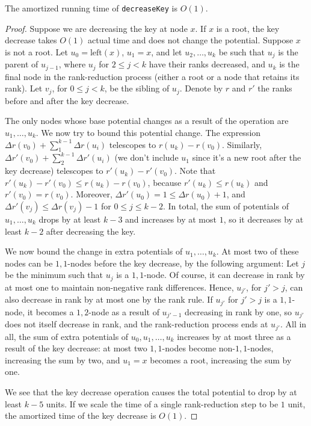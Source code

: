 \begin{lemma}
The amortized running time of \texttt{decreaseKey} is \(O(1)\).
\end{lemma}
\begin{proof}
Suppose we are decreasing the key at node \(x\). If \(x\) is a root, the key decrease takes \(O(1)\) actual time and does not change the potential. Suppose \(x\) is not a root. Let \(u_0 = \text{left}(x)\), \(u_1 = x\), and let \(u_2, \ldots, u_k\) be such that \(u_j\) is the parent of \(u_{j-1}\), where \(u_j\) for \(2 \leq j < k\) have their ranks decreased, and \(u_k\) is the final node in the rank-reduction process (either a root or a node that retains its rank). Let \(v_j\), for \(0 \leq j < k\), be the sibling of \(u_{j}\). Denote by \(r\) and \(r'\) the ranks before and after the key decrease.

The only nodes whose base potential changes as a result of the operation are \(u_1, \ldots, u_k\). We now try to bound this potential change. The expression \(\Delta r(v_0) + \sum_{1}^{k-1}\Delta r(u_i)\) telescopes to \(r(u_k) - r(v_0)\). Similarly, \(\Delta r'(v_0) + \sum_{2}^{k-1}\Delta r'(u_i)\) (we don't include \(u_1\) since it's a new root after the key decrease) telescopes to \(r'(u_k) - r'(v_0)\). Note that \(r'(u_k) - r'(v_0) \leq r(u_k) - r(v_0)\), because \(r'(u_k) \leq r(u_k)\) and \(r'(v_0) = r(v_0)\). Moreover, \(\Delta r'(u_0) = 1 \leq \Delta r(u_0) + 1\), and \(\Delta r'(v_j) \leq \Delta r(v_j) - 1\) for \(0 \leq j \leq k-2\). In total, the sum of potentials of \(u_1, \ldots, u_k\) drops by at least \(k - 3\) and increases by at most \(1\), so it decreases by at least \(k - 2\) after decreasing the key.

We now bound the change in extra potentials of \(u_1, \ldots, u_k\). At most two of these nodes can be \(1,1\)-nodes before the key decrease, by the following argument: Let \(j\) be the minimum such that \(u_j\) is a \(1,1\)-node. Of course, it can decrease in rank by at most one to maintain non-negative rank differences. Hence, \(u_{j'}\), for \(j' > j\), can also decrease in rank by at most one by the rank rule. If \(u_{j'}\) for \(j' > j\) is a \(1,1\)-node, it becomes a \(1,2\)-node as a result of \(u_{j'-1}\) decreasing in rank by one, so \(u_{j'}\) does not itself decrease in rank, and the rank-reduction process ends at \(u_{j'}\). All in all, the sum of extra potentials of \(u_0, u_1, \ldots, u_k\) increases by at most three as a result of the key decrease: at most two \(1,1\)-nodes become non-\(1,1\)-nodes, increasing the sum by two, and \(u_1 = x\) becomes a root, increasing the sum by one.

We see that the key decrease operation causes the total potential to drop by at least \(k - 5\) units. If we scale the time of a single rank-reduction step to be \(1\) unit, the amortized time of the key decrease is \(O(1)\).
\end{proof}
